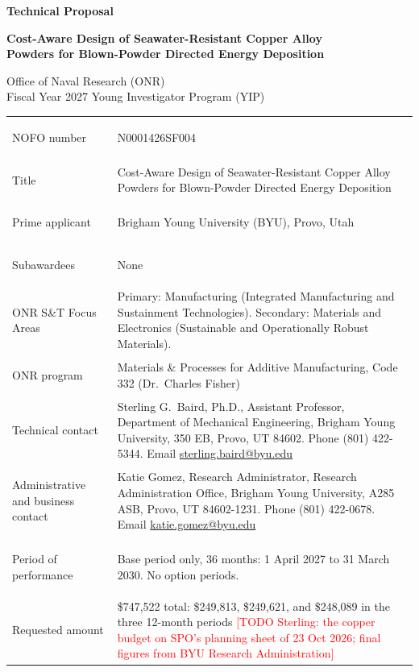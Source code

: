 \documentclass[12pt,letterpaper]{article}
\newcommand{\todo}[1]{\textcolor{red}{[TODO Sterling: #1]}}
\begin{document}
\begin{titlepage}
\begin{center}
{\Large\bfseries Technical Proposal\par}
\vspace{10pt}
{\large\bfseries Cost-Aware Design of Seawater-Resistant Copper Alloy\\
Powders for Blown-Powder Directed Energy Deposition\par}
\vspace{10pt}
Office of Naval Research (ONR)\\
Fiscal Year 2027 Young Investigator Program (YIP)
\end{center}
\vspace{12pt}
\renewcommand{\arraystretch}{1.25}
\begin{tabular}{@{}>{\bfseries\raggedright\arraybackslash}p{1.95in}>{\raggedright\arraybackslash}p{4.3in}@{}}
NOFO number & N0001426SF004 \\
Title & Cost-Aware Design of Seawater-Resistant Copper Alloy Powders for
  Blown-Powder Directed Energy Deposition \\
Prime applicant & Brigham Young University (BYU), Provo, Utah \\
Subawardees & None \\
ONR S\&T Focus Areas & Primary: Manufacturing (Integrated Manufacturing and
  Sustainment Technologies). Secondary: Materials and Electronics
  (Sustainable and Operationally Robust Materials). \\
ONR program & Materials \& Processes for Additive Manufacturing, Code 332
  (Dr.~Charles Fisher) \\
Technical contact & Sterling G.\ Baird, Ph.D., Assistant Professor,
  Department of Mechanical Engineering, Brigham Young University, 350 EB,
  Provo, UT 84602. Phone (801) 422-5344. Email
  \href{mailto:sterling.baird@byu.edu}{sterling.baird@byu.edu} \\
Administrative and business contact & Katie Gomez, Research Administrator,
  Research Administration Office, Brigham Young University, A285 ASB,
  Provo, UT 84602-1231. Phone (801) 422-0678. Email
  \href{mailto:katie.gomez@byu.edu}{katie.gomez@byu.edu} \\
Period of performance & Base period only, 36 months: 1 April 2027 to
  31 March 2030. No option periods. \\
Requested amount & \$747,522 total: \$249,813, \$249,621, and \$248,089
  in the three 12-month periods \todo{the copper budget on SPO's planning
  sheet of 23 Oct 2026; final figures from BYU
  Research Administration} \\
\end{tabular}
\end{titlepage}
\end{document}
